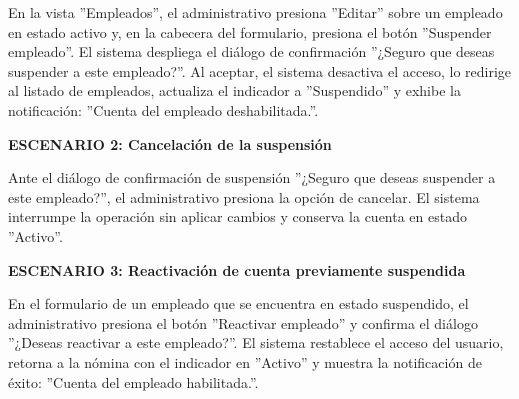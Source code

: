 \documentclass[a4paper,9pt]{article}
\begin{document}
\begin{tcolorbox}[hucard, title={\textbf{HU-66: SUSPENDER O DESHABILITAR PERSONAL} \hfill \scriptsize \colorbox{bluestatus}{\textbf{\ New\ }} \quad \colorbox{white}{\textcolor{primarydark}{\textbf{\ 2 pts\ }}}}]
{En la vista ''Empleados'', el administrativo presiona ''Editar'' sobre un empleado en estado activo y, en la cabecera del formulario, presiona el botón ''Suspender empleado''. El sistema despliega el diálogo de confirmación ''¿Seguro que deseas suspender a este empleado?''. Al aceptar, el sistema desactiva el acceso, lo redirige al listado de empleados, actualiza el indicador a ''Suspendido'' y exhibe la notificación: ''Cuenta del empleado deshabilitada.''.\par\vspace{2.5pt}
\noindent\textbf{\textcolor{secondarydark}{ESCENARIO 2:  Cancelación de la suspensión}}\par\vspace{1pt}
Ante el diálogo de confirmación de suspensión ''¿Seguro que deseas suspender a este empleado?'', el administrativo presiona la opción de cancelar. El sistema interrumpe la operación sin aplicar cambios y conserva la cuenta en estado ''Activo''.\par\vspace{2.5pt}
\noindent\textbf{\textcolor{secondarydark}{ESCENARIO 3:  Reactivación de cuenta previamente suspendida}}\par\vspace{1pt}
En el formulario de un empleado que se encuentra en estado suspendido, el administrativo presiona el botón ''Reactivar empleado'' y confirma el diálogo ''¿Deseas reactivar a este empleado?''. El sistema restablece el acceso del usuario, retorna a la nómina con el indicador en ''Activo'' y muestra la notificación de éxito: ''Cuenta del empleado habilitada.''.\par\vspace{2.5pt}
}\par
\end{tcolorbox}
\end{document}
